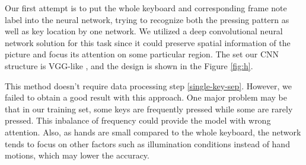 \documentclass[10pt,twocolumn,letterpaper]{article}
\begin{document}
   Our first attempt is to put the whole keyboard and corresponding frame note label into the neural network, trying to recognize both the pressing pattern as well as key location by one network.
   We utilized a deep convolutional neural network solution for this task since it could preserve spatial information of the picture and focus its attention on some particular region.
   The set our CNN structure is VGG-like \cite{VGG}, and the design is shown in the Figure \ref{fig:h}.

   This method doesn't require data processing step \ref{single-key-sep}.
   However, we failed to obtain a good result with this approach. 
   One major problem may be that in our training set, some keys are frequently pressed while some are rarely pressed.
   This inbalance of frequency could provide the model with wrong attention.
   Also, as hands are small compared to the whole keyboard, the network tends to focus on other factors such as illumination conditions instead of hand motions, which may lower the accuracy.
\end{document}
